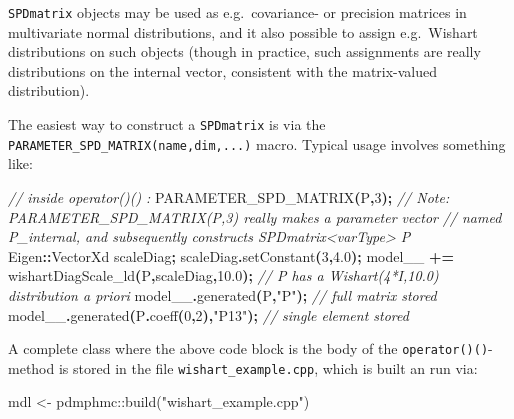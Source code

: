 \documentclass[
]{book}
\newenvironment{Shaded}{\begin{snugshade}}{\end{snugshade}}
\newcommand{\CommentTok}[1]{\textcolor[rgb]{0.56,0.35,0.01}{\textit{#1}}}
\newcommand{\DecValTok}[1]{\textcolor[rgb]{0.00,0.00,0.81}{#1}}
\newcommand{\FloatTok}[1]{\textcolor[rgb]{0.00,0.00,0.81}{#1}}
\newcommand{\FunctionTok}[1]{\textcolor[rgb]{0.00,0.00,0.00}{#1}}
\newcommand{\NormalTok}[1]{#1}
\newcommand{\OperatorTok}[1]{\textcolor[rgb]{0.81,0.36,0.00}{\textbf{#1}}}
\newcommand{\OtherTok}[1]{\textcolor[rgb]{0.56,0.35,0.01}{#1}}
\newcommand{\SpecialCharTok}[1]{\textcolor[rgb]{0.00,0.00,0.00}{#1}}
\newcommand{\StringTok}[1]{\textcolor[rgb]{0.31,0.60,0.02}{#1}}
\begin{document}
\texttt{SPDmatrix} objects may be used as e.g.~covariance- or precision matrices in multivariate normal distributions, and it also possible to assign e.g.~Wishart distributions on such objects (though in practice, such assignments are really distributions on the internal vector, consistent with the matrix-valued distribution).

The easiest way to construct a \texttt{SPDmatrix} is via the \texttt{PARAMETER\_SPD\_MATRIX(name,dim,...)} macro. Typical usage involves something like:

\begin{Shaded}
\begin{Highlighting}[]
\CommentTok{// inside operator()() : }
\NormalTok{PARAMETER\_SPD\_MATRIX}\OperatorTok{(}\NormalTok{P}\OperatorTok{,}\DecValTok{3}\OperatorTok{);} 
\CommentTok{// Note: PARAMETER\_SPD\_MATRIX(P,3) really makes a parameter vector  }
\CommentTok{// named P\_internal, and subsequently constructs SPDmatrix\textless{}varType\textgreater{} P}
\NormalTok{Eigen}\OperatorTok{::}\NormalTok{VectorXd scaleDiag}\OperatorTok{;}\NormalTok{ scaleDiag}\OperatorTok{.}\NormalTok{setConstant}\OperatorTok{(}\DecValTok{3}\OperatorTok{,}\FloatTok{4.0}\OperatorTok{);}
\NormalTok{model\_\_ }\OperatorTok{+=}\NormalTok{ wishartDiagScale\_ld}\OperatorTok{(}\NormalTok{P}\OperatorTok{,}\NormalTok{scaleDiag}\OperatorTok{,}\FloatTok{10.0}\OperatorTok{);} 
\CommentTok{// P has a Wishart(4*I,10.0) distribution a priori }
\NormalTok{model\_\_}\OperatorTok{.}\NormalTok{generated}\OperatorTok{(}\NormalTok{P}\OperatorTok{,}\StringTok{"P"}\OperatorTok{);} \CommentTok{// full matrix stored}
\NormalTok{model\_\_}\OperatorTok{.}\NormalTok{generated}\OperatorTok{(}\NormalTok{P}\OperatorTok{.}\NormalTok{coeff}\OperatorTok{(}\DecValTok{0}\OperatorTok{,}\DecValTok{2}\OperatorTok{),}\StringTok{"P13"}\OperatorTok{);} \CommentTok{// single element stored}
\end{Highlighting}
\end{Shaded}

A complete class where the above code block is the body of the \texttt{operator()()}-method is stored in the file \texttt{wishart\_example.cpp}, which is built an run via:

\begin{Shaded}
\begin{Highlighting}[]
\NormalTok{mdl }\OtherTok{\textless{}{-}}\NormalTok{ pdmphmc}\SpecialCharTok{::}\FunctionTok{build}\NormalTok{(}\StringTok{"wishart\_example.cpp"}\NormalTok{)}
\end{Highlighting}
\end{Shaded}
\end{document}
